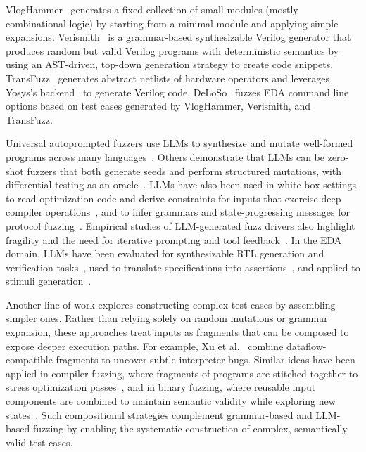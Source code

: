 VlogHammer~\cite{vloghammer} generates a fixed collection of small modules (mostly combinational logic) by starting from a minimal module and applying simple expansions.
Verismith~\cite{verismith} is a grammar-based synthesizable Verilog generator that produces random but valid Verilog programs with deterministic semantics by using an AST-driven, top-down generation strategy to create code snippets.
TransFuzz~\cite{mirtl} generates abstract netlists of hardware operators and leverages Yosys's backend~\cite{wolf2013yosys} to generate Verilog code.
DeLoSo~\cite{deloso} fuzzes EDA command line options based on test cases generated by VlogHammer, Verismith, and TransFuzz.

Universal autoprompted fuzzers use LLMs to synthesize and mutate well-formed programs across many languages~\cite{fuzz4all}.
Others demonstrate that LLMs can be zero-shot fuzzers that both generate seeds and perform structured mutations, with differential testing as an oracle~\cite{titanfuzz}.
LLMs have also been used in white-box settings to read optimization code and derive constraints for inputs that exercise deep compiler operations~\cite{whitefox}, and to infer grammars and state-progressing messages for protocol fuzzing~\cite{meng2024chatafl}.
Empirical studies of LLM-generated fuzz drivers also highlight fragility and the need for iterative prompting and tool feedback~\cite{zhang2024fuzzdriver}.
In the EDA domain, LLMs have been evaluated for synthesizable RTL generation and verification tasks~\cite{verilog-eval,hdleval}, used to translate specifications into assertions~\cite{assertllm}, and applied to stimuli generation~\cite{verilogreader}.

Another line of work explores constructing complex test cases by assembling simpler ones. 
Rather than relying solely on random mutations or grammar expansion, these approaches treat inputs as fragments that can be composed to expose deeper execution paths. 
For example, Xu et al.~\cite{xu2025phpfusion} combine dataflow-compatible fragments to uncover subtle interpreter bugs. 
Similar ideas have been applied in compiler fuzzing, where fragments of programs are stitched together to stress optimization passes~\cite{Yang2011Csmith, sun2016goopt, lidbury2015manycore}, and in binary fuzzing, where reusable input components are combined to maintain semantic validity while exploring new states~\cite{lemieux2018fairfuzz, bohme2019fuzzing}. 
Such compositional strategies complement grammar-based and LLM-based fuzzing by enabling the systematic construction of complex, semantically valid test cases.
